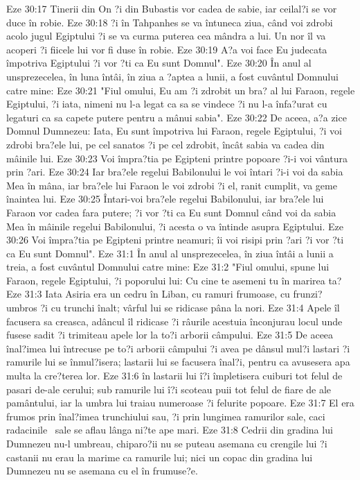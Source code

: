 Eze 30:17  Tinerii din On ?i din Bubastis vor cadea de sabie, iar ceilal?i se vor duce în robie.
Eze 30:18  ?i în Tahpanhes se va întuneca ziua, când voi zdrobi acolo jugul Egiptului ?i se va curma puterea cea mândra a lui. Un nor îl va acoperi ?i fiicele lui vor fi duse în robie.
Eze 30:19  A?a voi face Eu judecata împotriva Egiptului ?i vor ?ti ca Eu sunt Domnul".
Eze 30:20  În anul al unsprezecelea, în luna întâi, în ziua a ?aptea a lunii, a fost cuvântul Domnului catre mine:
Eze 30:21  "Fiul omului, Eu am ?i zdrobit un bra? al lui Faraon, regele Egiptului, ?i iata, nimeni nu l-a legat ca sa se vindece ?i nu l-a înfa?urat cu legaturi ca sa capete putere pentru a mânui sabia".
Eze 30:22  De aceea, a?a zice Domnul Dumnezeu: Iata, Eu sunt împotriva lui Faraon, regele Egiptului, ?i voi zdrobi bra?ele lui, pe cel sanatos ?i pe cel zdrobit, încât sabia va cadea din mâinile lui.
Eze 30:23  Voi împra?tia pe Egipteni printre popoare ?i-i voi vântura prin ?ari.
Eze 30:24  Iar bra?ele regelui Babilonului le voi întari ?i-i voi da sabia Mea în mâna, iar bra?ele lui Faraon le voi zdrobi ?i el, ranit cumplit, va geme înaintea lui.
Eze 30:25  Întari-voi bra?ele regelui Babilonului, iar bra?ele lui Faraon vor cadea fara putere; ?i vor ?ti ca Eu sunt Domnul când voi da sabia Mea în mâinile regelui Babilonului, ?i acesta o va întinde asupra Egiptului.
Eze 30:26  Voi împra?tia pe Egipteni printre neamuri; îi voi risipi prin ?ari ?i vor ?ti ca Eu sunt Domnul".
Eze 31:1  În anul al unsprezecelea, în ziua întâi a lunii a treia, a fost cuvântul Domnului catre mine:
Eze 31:2  "Fiul omului, spune lui Faraon, regele Egiptului, ?i poporului lui: Cu cine te asemeni tu în marirea ta?
Eze 31:3  Iata Asiria era un cedru în Liban, cu ramuri frumoase, cu frunzi? umbros ?i cu trunchi înalt; vârful lui se ridicase pâna la nori.
Eze 31:4  Apele îl facusera sa creasca, adâncul îl ridicase ?i râurile acestuia înconjurau locul unde fusese sadit ?i trimiteau apele lor la to?i arborii câmpului.
Eze 31:5  De aceea înal?imea lui întrecuse pe to?i arborii câmpului ?i avea pe dânsul mul?i lastari ?i ramurile lui se înmul?isera; lastarii lui se facusera înal?i, pentru ca avusesera apa multa la cre?terea lor.
Eze 31:6  în lastarii lui î?i împletisera cuiburi tot felul de pasari de-ale cerului; sub ramurile lui î?i scoteau puii tot felul de fiare de ale pamântului, iar la umbra lui traiau numeroase ?i felurite popoare.
Eze 31:7  El era frumos prin înal?imea trunchiului sau, ?i prin lungimea ramurilor sale, caci radacinile  sale se aflau lânga ni?te ape mari.
Eze 31:8  Cedrii din gradina lui Dumnezeu nu-l umbreau, chiparo?ii nu se puteau asemana cu crengile lui ?i castanii nu erau la marime ca ramurile lui; nici un copac din gradina lui Dumnezeu nu se asemana cu el în frumuse?e.
